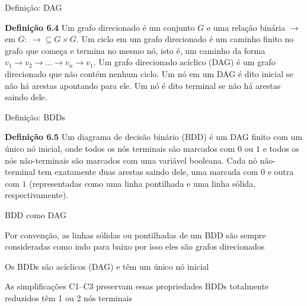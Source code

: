 \expandafter\documentclass\expandafter[table, usenames, svgnames, dvipsnames,14pt, \classopts]{beamer}
\begin{document}
\begin{frame}{Definição: \uppercase{DAG}}

    \begin{block}{\textbf{Definição 6.4}}
        Um grafo direcionado é um conjunto $\mathit{G}$ e uma relação binária $\rightarrow$ em $\mathit{G}:~\rightarrow \subseteq \mathit{G} \times \mathit{G}$. Um ciclo em um grafo direcionado é um caminho finito no grafo que começa e termina no mesmo nó, isto é, um caminho da forma $v_1 \rightarrow v_2 \rightarrow ... \rightarrow v_n \rightarrow v_1$. Um grafo direcionado acíclico (DAG) é um grafo direcionado que não contém nenhum ciclo. Um nó em um DAG é dito inicial se não há arestas apontando para ele. Um nó é dito terminal se não há arestas saindo dele.
    \end{block}

\end{frame}

\begin{frame}{Definição: \uppercase{BDD}s}

    \begin{block}{\textbf{Definição 6.5}}
        Um diagrama de decisão binário (BDD) é um DAG finito com um único nó inicial, onde todos os nós terminais são marcados com $0$ ou $1$ e todos os nós não-terminais são marcados com uma variável booleana. Cada nó não-terminal tem exatamente duas arestas saindo dele, uma marcada com $0$ e outra com $1$ (representadas como uma linha pontilhada e uma linha sólida, respectivamente).
    \end{block}

\end{frame}

\begin{frame}{\uppercase{BDD} como \uppercase{DAG}}

    \begin{outline}
        \1 Por convenção, as linhas sólidas ou pontilhadas de um BDD são sempre consideradas como indo para baixo
            \2[-] por isso eles são grafos direcionados
        
        \vspace{1em}
        
        \1 Os BDDs são acíclicos (DAG) e têm um único nó inicial

        \vspace{1em}
        
        \1 As simplificações C1--C3 preservam essas propriedades
            \2[-] BDDs totalmente reduzidos têm 1 ou 2 nós terminais
    \end{outline}

\end{frame}
\end{document}
